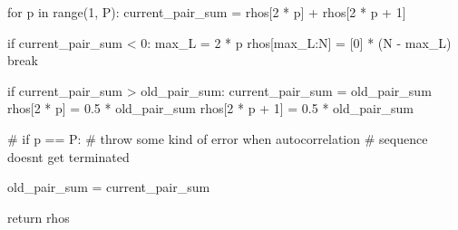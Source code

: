 \documentclass[
  letterpaper,
  DIV=11,
  numbers=noendperiod]{scrartcl}
\newenvironment{Shaded}{\begin{snugshade}}{\end{snugshade}}
\newcommand{\BuiltInTok}[1]{\textcolor[rgb]{0.00,0.23,0.31}{#1}}
\newcommand{\CommentTok}[1]{\textcolor[rgb]{0.37,0.37,0.37}{#1}}
\newcommand{\ControlFlowTok}[1]{\textcolor[rgb]{0.00,0.23,0.31}{#1}}
\newcommand{\DecValTok}[1]{\textcolor[rgb]{0.68,0.00,0.00}{#1}}
\newcommand{\FloatTok}[1]{\textcolor[rgb]{0.68,0.00,0.00}{#1}}
\newcommand{\KeywordTok}[1]{\textcolor[rgb]{0.00,0.23,0.31}{#1}}
\newcommand{\NormalTok}[1]{\textcolor[rgb]{0.00,0.23,0.31}{#1}}
\newcommand{\OperatorTok}[1]{\textcolor[rgb]{0.37,0.37,0.37}{#1}}
\begin{document}
\begin{Shaded}
\begin{Highlighting}[]
  \ControlFlowTok{for}\NormalTok{ p }\KeywordTok{in} \BuiltInTok{range}\NormalTok{(}\DecValTok{1}\NormalTok{, P):}
\NormalTok{    current\_pair\_sum }\OperatorTok{=}\NormalTok{ rhos[}\DecValTok{2} \OperatorTok{*}\NormalTok{ p] }\OperatorTok{+}\NormalTok{ rhos[}\DecValTok{2} \OperatorTok{*}\NormalTok{ p }\OperatorTok{+} \DecValTok{1}\NormalTok{]}
    
    \ControlFlowTok{if}\NormalTok{ current\_pair\_sum }\OperatorTok{\textless{}} \DecValTok{0}\NormalTok{:}
\NormalTok{      max\_L }\OperatorTok{=} \DecValTok{2} \OperatorTok{*}\NormalTok{ p}
\NormalTok{      rhos[max\_L:N] }\OperatorTok{=}\NormalTok{ [}\DecValTok{0}\NormalTok{] }\OperatorTok{*}\NormalTok{ (N }\OperatorTok{{-}}\NormalTok{ max\_L)}
      \ControlFlowTok{break}
    
    \ControlFlowTok{if}\NormalTok{ current\_pair\_sum }\OperatorTok{\textgreater{}}\NormalTok{ old\_pair\_sum:}
\NormalTok{      current\_pair\_sum }\OperatorTok{=}\NormalTok{ old\_pair\_sum}
\NormalTok{      rhos[}\DecValTok{2} \OperatorTok{*}\NormalTok{ p]     }\OperatorTok{=} \FloatTok{0.5} \OperatorTok{*}\NormalTok{ old\_pair\_sum}
\NormalTok{      rhos[}\DecValTok{2} \OperatorTok{*}\NormalTok{ p }\OperatorTok{+} \DecValTok{1}\NormalTok{] }\OperatorTok{=} \FloatTok{0.5} \OperatorTok{*}\NormalTok{ old\_pair\_sum}
    
    \CommentTok{\# if p == P:}
      \CommentTok{\# throw some kind of error when autocorrelation}
      \CommentTok{\# sequence doesn\textquotesingle{}t get terminated}
    
\NormalTok{    old\_pair\_sum }\OperatorTok{=}\NormalTok{ current\_pair\_sum}
  
  \ControlFlowTok{return}\NormalTok{ rhos}
\end{Highlighting}
\end{Shaded}
\end{document}
